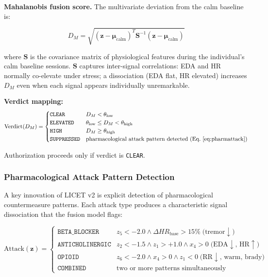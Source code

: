 \documentclass[12pt,a4paper]{article}
\begin{document}
\textbf{Mahalanobis fusion score.} The multivariate deviation from the calm
baseline is:

\begin{equation}
D_M = \sqrt{(\mathbf{z} - \boldsymbol{\mu}_{\text{calm}})^T
\mathbf{S}^{-1}
(\mathbf{z} - \boldsymbol{\mu}_{\text{calm}})}
\label{eq:mahal}
\end{equation}

where $\mathbf{S}$ is the covariance matrix of physiological features during
the individual's calm baseline sessions. $\mathbf{S}$ captures inter-signal
correlations: EDA and HR normally co-elevate under stress; a dissociation
(EDA flat, HR elevated) increases $D_M$ even when each signal appears
individually unremarkable.

\textbf{Verdict mapping:}
\begin{equation}
\text{Verdict}(D_M) =
\begin{cases}
\texttt{CLEAR}     & D_M < \theta_{\text{low}} \\
\texttt{ELEVATED}  & \theta_{\text{low}} \leq D_M < \theta_{\text{high}} \\
\texttt{HIGH}      & D_M \geq \theta_{\text{high}} \\
\texttt{SUPPRESSED}& \text{pharmacological attack pattern detected (Eq.~\ref{eq:pharmattack})}
\end{cases}
\end{equation}

Authorization proceeds only if verdict is \texttt{CLEAR}.

\subsubsection{Pharmacological Attack Pattern Detection}
\label{sec:pharmattack}

A key innovation of LICET v2 is explicit detection of pharmacological
countermeasure patterns. Each attack type produces a characteristic signal
dissociation that the fusion model flags:

\begin{equation}
\text{Attack}(\mathbf{z}) =
\begin{cases}
\texttt{BETA\_BLOCKER}   & z_5 < -2.0 \land \Delta HR_{\text{base}} > 15\%
                           \;\text{(tremor}\downarrow\text{)} \\[4pt]
\texttt{ANTICHOLINERGIC} & z_2 < -1.5 \land z_1 > +1.0 \land x_4 > 0
                           \;\text{(EDA}\downarrow\text{, HR}\uparrow\text{)} \\[4pt]
\texttt{OPIOID}          & z_6 < -2.0 \land x_4 > 0 \land z_1 < 0
                           \;\text{(RR}\downarrow\text{, warm, brady)} \\[4pt]
\texttt{COMBINED}        & \text{two or more patterns simultaneously}
\end{cases}
\label{eq:pharmattack}
\end{equation}
\end{document}
